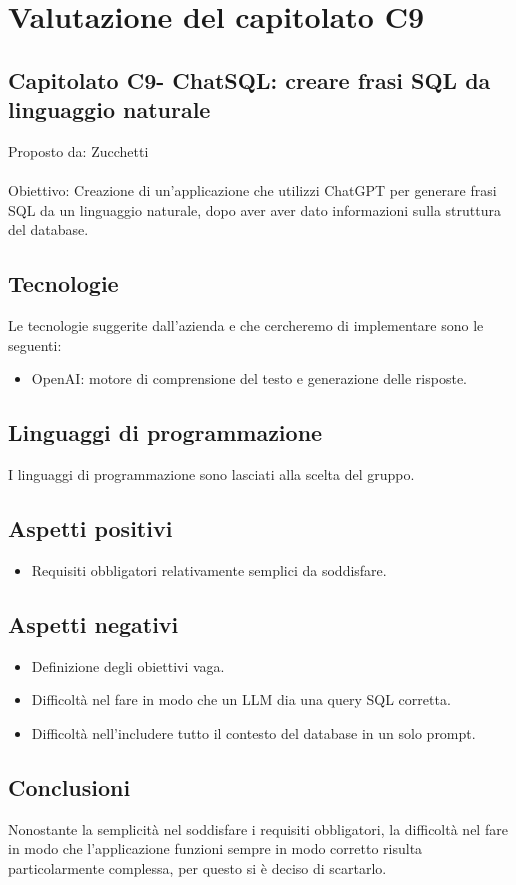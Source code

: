 \documentclass{article}
\begin{document}
\section{Valutazione del capitolato C9}
\subsection{Capitolato C9- ChatSQL: creare frasi SQL da linguaggio naturale}
Proposto da: Zucchetti\\ \\
Obiettivo: Creazione di un'applicazione che utilizzi ChatGPT per generare frasi SQL da un linguaggio naturale, dopo aver aver dato informazioni sulla struttura del database.
\subsection{Tecnologie}
Le tecnologie suggerite dall’azienda e che cercheremo di implementare sono le seguenti:
\begin{itemize}
    \item OpenAI: motore di comprensione del testo e generazione delle risposte.
\end{itemize}
\subsection{Linguaggi di programmazione}
I linguaggi di programmazione sono lasciati alla scelta del gruppo.
\subsection{Aspetti positivi}
\begin{itemize}
    \item Requisiti obbligatori relativamente semplici da soddisfare.
\end{itemize}
\subsection{Aspetti negativi}
\begin{itemize}
    \item Definizione degli obiettivi vaga.
    \item Difficoltà nel fare in modo che un LLM dia una query SQL corretta.
    \item Difficoltà nell'includere tutto il contesto del database in un solo prompt.
\end{itemize}
\subsection{Conclusioni}
Nonostante la semplicità nel soddisfare i requisiti obbligatori, la difficoltà nel fare in modo che l'applicazione funzioni sempre in modo corretto risulta particolarmente complessa, per questo si è deciso di scartarlo.
\end{document}
